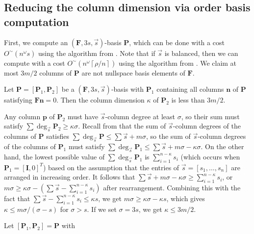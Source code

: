 \subsection{\label{sub:continueComputingNullspaceBasisByColumns}Reducing the
column dimension via order basis computation}

First, we compute an $\left(\mathbf{F},3s,\vec{s}\right)$-basis $\mathbf{P}$,
which can be done with a cost $O^{\sim}\left(n^{\omega}s\right)$
using the algorithm from \citet{Giorgi2003}. Note that if $\vec{s}$
is balanced, then we can compute with a cost $O^{\sim}\left(n^{\omega}\left\lceil \rho/n\right\rceil \right)$
using the algorithm from \textbf{\citet{za2009}}. We claim at most
$3m/2$ columns of \textbf{$\mathbf{P}$} are not nullspace basis
elements of $\mathbf{F}$.
\begin{lem}
\label{lem:dimensionOfPartialNullspaceBasisBasedOnOrder} Let $\mathbf{P}=[\mathbf{P}_{1},\mathbf{P}_{2}]$
be a $(\mathbf{F},3s,\vec{s})$-basis with $\mathbf{P}_{1}$ containing
all columns $\mathbf{n}$ of $\mathbf{P}$ satisfying $\mathbf{F}\mathbf{n}=0$.
Then the column dimension $\kappa$ of $\mathbf{P}_{2}$ is less than
$3m/2.$\end{lem}
\begin{pf}
Any column $\mathbf{p}$ of $\mathbf{P}_{2}$ must have $\vec{s}$-column
degree at least $\sigma$, so their sum must satisfy $\sum\deg_{\vec{s}}\mathbf{P}_{2}\ge\kappa\sigma$.
Recall from 
that the sum of $\vec{s}$-column degrees of the columns of $\mathbf{P}$
satisfies $\sum\deg_{\vec{s}}\mathbf{P}\le\sum\vec{s}+m\sigma$, so
the sum of $\vec{s}$-column degrees of the columns of $\mathbf{P}_{1}$
must satisfy $\sum\deg_{\vec{s}}\mathbf{P}_{1}\le\sum\vec{s}+m\sigma-\kappa\sigma$.
On the other hand, the lowest possible value of $\sum\deg_{\vec{s}}\mathbf{P}_{1}$
is $\sum_{i=1}^{n-\kappa}s_{i}$ (which occurs when $\mathbf{P}_{1}=\left[\mathbf{I},0\right]^{T}$)
based on the assumption that the entries of $\vec{s}=\left[s_{1},\dots,s_{n}\right]$
are arranged in increasing order. It follows that $\sum\vec{s}+m\sigma-\kappa\sigma\ge\sum_{i=1}^{n-\kappa}s_{i}$,
or $m\sigma\ge\kappa\sigma-\left(\sum\vec{s}-\sum_{i=1}^{n-\kappa}s_{i}\right)$
after rearrangement. Combining this with the fact that $\sum\vec{s}-\sum_{i=1}^{n-\kappa}s_{i}\le\kappa s$,
we get $m\sigma\ge\kappa\sigma-\kappa s$, which gives $\kappa\le m\sigma/(\sigma-s)$
for $\sigma>s$. If we set $\sigma=3s$, we get $\kappa\le3m/2$.
\end{pf}
Let $\left[\mathbf{P}_{1},\mathbf{P}_{2}\right]=\mathbf{P}$ with
